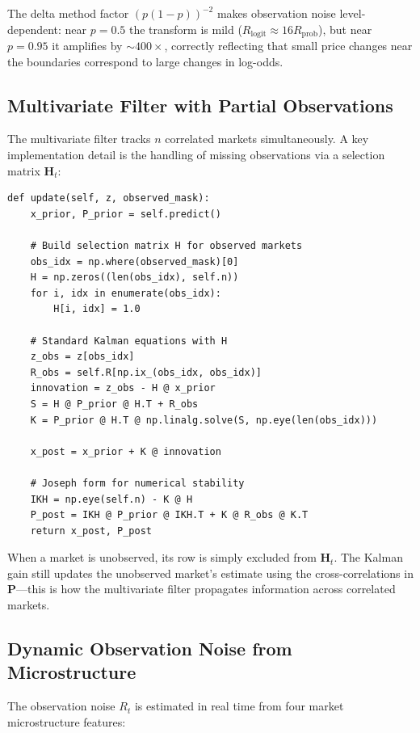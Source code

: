 \documentclass[11pt, a4paper]{article}
\begin{document}
The delta method factor $(p(1-p))^{-2}$ makes observation noise level-dependent: near $p = 0.5$ the transform is mild ($R_{\text{logit}} \approx 16 R_{\text{prob}}$), but near $p = 0.95$ it amplifies by $\sim\!400\times$, correctly reflecting that small price changes near the boundaries correspond to large changes in log-odds.

\subsection{Multivariate Filter with Partial Observations}

The multivariate filter tracks $n$ correlated markets simultaneously. A key implementation detail is the handling of missing observations via a selection matrix $\mathbf{H}_t$:

\begin{lstlisting}[style=python, caption={Multivariate update with partial observations and Joseph form (\texttt{multivariate\_kalman.py}).}]
def update(self, z, observed_mask):
    x_prior, P_prior = self.predict()

    # Build selection matrix H for observed markets
    obs_idx = np.where(observed_mask)[0]
    H = np.zeros((len(obs_idx), self.n))
    for i, idx in enumerate(obs_idx):
        H[i, idx] = 1.0

    # Standard Kalman equations with H
    z_obs = z[obs_idx]
    R_obs = self.R[np.ix_(obs_idx, obs_idx)]
    innovation = z_obs - H @ x_prior
    S = H @ P_prior @ H.T + R_obs
    K = P_prior @ H.T @ np.linalg.solve(S, np.eye(len(obs_idx)))

    x_post = x_prior + K @ innovation

    # Joseph form for numerical stability
    IKH = np.eye(self.n) - K @ H
    P_post = IKH @ P_prior @ IKH.T + K @ R_obs @ K.T
    return x_post, P_post
\end{lstlisting}

When a market is unobserved, its row is simply excluded from $\mathbf{H}_t$. The Kalman gain still updates the unobserved market's estimate using the cross-correlations in $\mathbf{P}$---this is how the multivariate filter propagates information across correlated markets.

\subsection{Dynamic Observation Noise from Microstructure}

The observation noise $R_t$ is estimated in real time from four market microstructure features:
\end{document}
